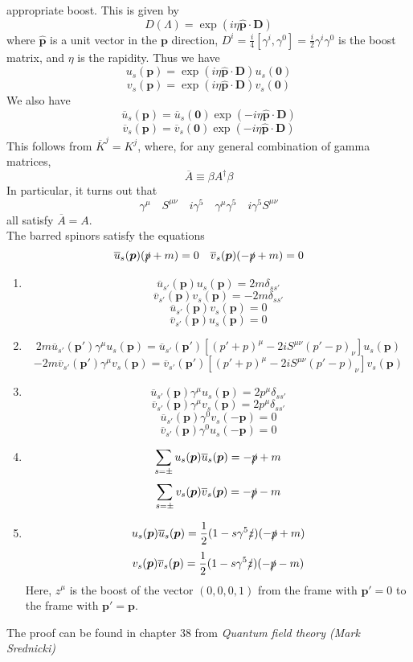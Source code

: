 appropriate boost. This is given by
\[D(\Lambda) = \exp(i\eta \hat{\bm{p}} \cdot \bm{D})\]
where $\hat{\bm{p}}$ is a unit vector in the $\bm{p}$ direction, $D^i = \frac{i}{4}[\gamma^i,\gamma^0] = \frac{i}{2} \gamma^i \gamma^0$ is the boost matrix, and $\eta$ is the rapidity. Thus we have
\[u_s(\bm{p}) = \exp(i\eta \hat{\bm{p}} \cdot \bm{D}) u_s(\bm{0})\]
\[v_s(\bm{p}) = \exp(i\eta \hat{\bm{p}} \cdot \bm{D}) v_s(\bm{0})\]
We also have
\[\overline{u}_s(\bm{p}) = \overline{u}_s(\bm{0}) \exp(-i\eta \hat{\bm{p}} \cdot \bm{D}) \]
\[\overline{v}_s(\bm{p}) = \overline{v}_s(\bm{0}) \exp(-i\eta \hat{\bm{p}} \cdot \bm{D}) \]
This follows from $\overline{K}^j = K^j$, where, for any general combination of gamma matrices,
\[\overline{A} \equiv \beta A^{\dagger} \beta\]
In particular, it turns out that
\[\gamma^{\mu} \quad S^{\mu \nu} \quad i\gamma^5  \quad \gamma^{\mu}\gamma^5 \quad i\gamma^5 S^{\mu \nu}\]
all satisfy $\overline{A} = A$.\\
The barred spinors satisfy the equations
\[\overline{u}_s(\bm{p})(\slashed{p}+m)=0 \quad \overline{v}_s(\bm{p})(-\slashed{p}+m)=0\]

\begin{newprop}
\begin{enumerate}
\item \[\overline{u}_{s'}(\bm{p}) u_s(\bm{p}) = 2m\delta_{ss'}\]
\[\overline{v}_{s'}(\bm{p}) v_s(\bm{p}) = -2m\delta_{ss'}\]
\[\overline{u}_{s'}(\bm{p}) v_s(\bm{p}) = 0\]
\[\overline{v}_{s'}(\bm{p}) u_s(\bm{p}) = 0\]
\item 
\[2m \overline{u}_{s'}(\bm{p}') \gamma^{\mu} u_s(\bm{p}) =  \overline{u}_{s'}(\bm{p}') [(p'+p)^{\mu} -2i S^{\mu \nu}(p'-p)_{\nu}]u_s(\bm{p})\]
\[-2m \overline{v}_{s'}(\bm{p}') \gamma^{\mu} v_s(\bm{p}) =  \overline{v}_{s'}(\bm{p}') [(p'+p)^{\mu} -2i S^{\mu \nu}(p'-p)_{\nu}]v_s(\bm{p})\]
\item   \[\overline{u}_{s'}(\bm{p}) \gamma^{\mu} u_s(\bm{p}) = 2p^{\mu} \delta_{ss'}\]
\[\overline{v}_{s'}(\bm{p}) \gamma^{\mu} v_s(\bm{p}) = 2p^{\mu} \delta_{ss'}\]
\[\overline{u}_{s'}(\bm{p}) \gamma^{0} v_s(-\bm{p}) = 0\]
\[\overline{v}_{s'}(\bm{p}) \gamma^{0} u_s(-\bm{p}) = 0\]
\item \[\sum_{s=\pm} u_s(\bm{p}) \overline{u}_s(\bm{p}) = - \slashed{p}+m \]
\[\sum_{s=\pm} v_s(\bm{p}) \overline{v}_s(\bm{p}) = - \slashed{p}-m \]
\item \[u_s(\bm{p}) \overline{u}_s(\bm{p}) =\frac{1}{2}(1-s\gamma^5\slashed{z})(-\slashed{p}+m)\]
 \[v_s(\bm{p}) \overline{v}_s(\bm{p}) =\frac{1}{2}(1-s\gamma^5\slashed{z})(-\slashed{p}-m)\]
Here, $z^{\mu}$ is the boost of the vector $(0,0,0,1)$ from the frame with $\bm{p}'=0$ to the frame with $\bm{p}'=\bm{p}$.  
\end{enumerate}
The proof can be found in chapter 38 from \emph{Quantum field theory (Mark Srednicki)}
\end{newprop}

